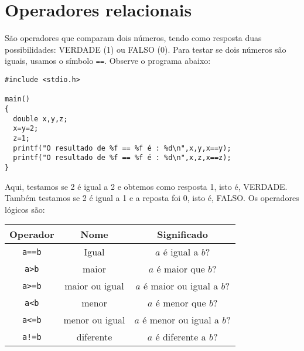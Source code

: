\section{Operadores relacionais}
São operadores que comparam dois números, tendo como resposta duas possibilidades: VERDADE (1) ou FALSO (0). Para testar se dois números são iguais, usamos o símbolo \verb|==|. Observe o programa abaixo:
\begin{verbatim}
#include <stdio.h>

main()
{
  double x,y,z;
  x=y=2;
  z=1;
  printf("O resultado de %f == %f é : %d\n",x,y,x==y);
  printf("O resultado de %f == %f é : %d\n",x,z,x==z);
}
\end{verbatim}
Aqui, testamos se 2 é igual a 2 e obtemos como resposta 1, isto é, VERDADE. Também testamos se 2 é igual a 1 e a reposta foi 0, isto é, FALSO. Os operadores lógicos são:

\begin{tabular}{|c|c|c|}
\hline
 Operador& Nome & Significado\\\hline
\verb|a==b|&Igual&$a$ é igual a $b$?\\\hline
\verb|a>b|&maior&$a$ é maior que $b$?\\\hline
\verb|a>=b|&maior ou igual&$a$ é maior ou igual a $b$?\\\hline
\verb|a<b|&menor&$a$ é menor que $b$?\\\hline
\verb|a<=b|&menor ou igual&$a$ é menor ou igual a $b$?\\\hline
\verb|a!=b|&diferente&$a$ é diferente a $b$?\\\hline
\end{tabular}



